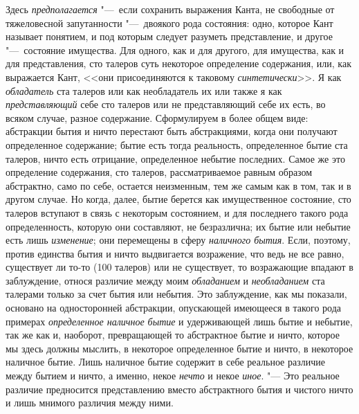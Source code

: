 Здесь {\em предполагается} "---~если сохранить выражения
Канта, не свободные от тяжеловесной запутанности "---~двоякого рода состояния:
одно, которое Кант называет понятием, и под которым следует разуметь
представление, и другое "---~состояние имущества. Для одного, как и для
другого, для имущества, как и для представления, сто талеров суть некоторое
определение содержания, или, как выражается Кант, <<они присоединяются к
таковому {\em синтетически}>>. Я как
{\em обладатель} ста талеров или как необладатель их
или также я как {\em представляющий} себе сто талеров
или не представляющий себе их есть, во всяком случае, разное содержание.
Сформулируем в более общем виде: абстракции бытия и ничто перестают быть
абстракциями, когда они получают определенное содержание; бытие есть тогда
реальность, определенное бытие ста талеров, ничто есть отрицание,
определенное небытие последних. Самое же это определение содержания, сто
талеров, рассматриваемое равным образом абстрактно, само по себе, остается
неизменным, тем же самым как в том, так и в другом случае. Но когда, далее,
бытие берется как имущественное состояние, сто талеров вступают в связь с
некоторым состоянием, и для последнего такого рода определенность, которую
они составляют, не безразлична; их бытие или небытие есть лишь
{\em изменение}; они перемещены в сферу
{\em наличного бытия}. Если, поэтому, против единства
бытия и ничто выдвигается возражение, что ведь не все равно, существует ли
то-то (100 талеров) или не существует, то возражающие впадают в
заблуждение, относя различие между моим
{\em обладанием} и
{\em необладанием} ста талерами только за счет бытия
или небытия. Это заблуждение, как мы показали, основано на односторонней
абстракции, опускающей имеющееся в такого рода примерах
{\em определенное наличное бытие} и удерживающей лишь
бытие и небытие, так же как и, наоборот, превращающей то абстрактное бытие
и ничто, которое мы здесь должны мыслить, в некоторое определенное бытие и
ничто, в некоторое наличное бытие. Лишь наличное бытие содержит в себе
реальное различие между бытием и ничто, а именно, некое
{\em нечто} и некое {\em иное}. "---
Это реальное различие предносится представлению вместо абстрактного бытия и
чистого ничто и лишь мнимого различия между ними.

